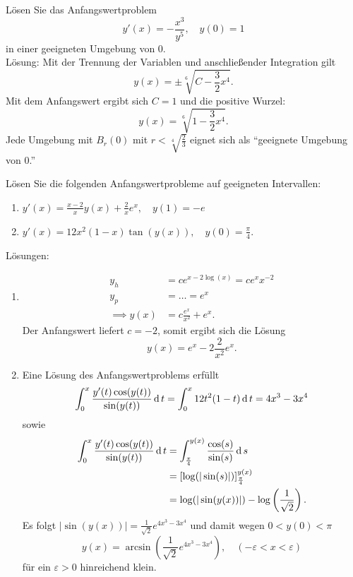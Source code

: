 Lösen Sie das Anfangswertproblem 
\begin{displaymath}
  y'(x) = -\frac{x^3}{y^5}, \quad y(0) = 1
\end{displaymath}
in einer geeigneten Umgebung von 0.\\
Lösung: 
Mit der Trennung der Variablen und anschließender Integration gilt
\begin{displaymath}
  y(x) = \pm \sqrt[6]{C - \frac{3}{2}x^4}.
\end{displaymath}
Mit dem Anfangswert ergibt sich $C = 1$ und die positive Wurzel:
\begin{displaymath}
  y(x) = \sqrt[6]{1 - \frac{3}{2}x^4}.
\end{displaymath}
Jede Umgebung mit $B_r(0)$ mit $r < \sqrt[4]{\frac{2}{3}}$ eignet sich als ``geeignete Umgebung von 0.''

Lösen Sie die folgenden Anfangswertprobleme auf geeigneten Intervallen:
\begin{enumerate}
    \item $y'(x) = \frac{x - 2}{x} y(x) + \frac{2}{x}e^x, \quad y(1) = -e$
    \item $y'(x) = 12x^2(1 - x) \tan(y(x)), \quad y(0) = \frac{\pi}{4}$.
\end{enumerate}
Lösungen:
\begin{enumerate}
    \item 
    \begin{align*}
      y_h &= ce^{x - 2\log(x)} = ce^x x^{-2}\\
      y_p &= \dots = e^x\\
      \implies y(x) &= c\frac{e^x}{x^2} + e^x.
    \end{align*}
    Der Anfangswert liefert $c = -2$, somit ergibt sich die Lösung
\begin{displaymath}
  y(x) = e^x - 2\frac{2}{x^2}e^x.
\end{displaymath}
  \item
  Eine Lösung des Anfangswertproblems erfüllt
  \begin{displaymath}
    \int_0^x \frac{y'(t) \cos(y(t))}{\sin(y(t))} \operatorname{\mathop{}\!\mathrm{d}} t = \int_0^x 12t^2(1 - t) \operatorname{\mathop{}\!\mathrm{d}} t = 4x^3 - 3x^4 
  \end{displaymath}
  sowie
  \begin{align*}
    \int_0^x \frac{y'(t) \cos(y(t))}{\sin(y(t))} \operatorname{\mathop{}\!\mathrm{d}} t &= \int_{\frac{\pi}{4}}^{y(x)} \frac{\cos(s)}{\sin(s)} \operatorname{\mathop{}\!\mathrm{d}} s\\
    &= [\log(|\sin(s)|)]_{\frac{\pi}{4}}^{y(x)}\\
    &= \log(|\sin(y(x))|) - \log\left(\frac{1}{\sqrt{2}}\right).
  \end{align*}
  Es folgt $|\sin(y(x))| = \frac{1}{\sqrt{2}} e^{4x^3 - 3x^4}$ und damit wegen $0 < y(0) < \pi$
  \begin{displaymath}
    y(x) = \arcsin\left(\frac{1}{\sqrt{2}}e^{4x^3 - 3x^4}\right), \quad (-\varepsilon < x < \varepsilon)
  \end{displaymath}
  für ein $\varepsilon > 0$ hinreichend klein.
\end{enumerate}

